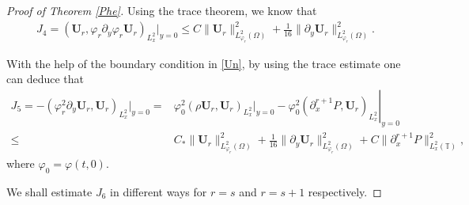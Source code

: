 \documentclass{amsart}
\numberwithin{equation}{section}
\begin{document}
\begin{proof}[Proof of Theorem \ref{Phe}]
Using the trace theorem, we know that
\begin{align*}
J_{4}
=(\mathbf{U}_{r},\varphi_{r}\partial_{y}\varphi_{r}\mathbf{U}_{r})_{L_{x}^{2}}|_{y=0}
\leq C\|\mathbf{U}_{r}\|_{L_{\varphi_{r}}^{2}(\Omega)}^{2}
     +\frac{1}{16}\|\partial_{y}\mathbf{U}_{r}\|_{L_{\varphi_{r}}^{2}(\Omega)}^{2}.
\end{align*}


With the help of the boundary condition in \eqref{Un}, by using the trace estimate one can deduce that
\begin{align*}
J_{5}
=-(\varphi_{r}^{2}\partial_{y}\mathbf{U}_{r},\mathbf{U}_{r})_{L_{x}^{2}}|_{y=0}
=& \varphi_{0}^{2}(\rho \mathbf{U}_{r},\mathbf{U}_{r})_{L_{x}^{2}}|_{y=0}
  -\left.\varphi_{0}^{2}(\partial_{x}^{r+1}P,\mathbf{U}_{r})_{L_{x}^{2}}\right|_{y=0}\\
\leq& C_{*}\|\mathbf{U}_{r}\|_{L_{\varphi_{r}}^{2}(\Omega)}^{2}
     +\frac{1}{16}\|\partial_{y}\mathbf{U}_{r}\|_{L_{\varphi_{r}}^{2}(\Omega)}^{2}
     +C\|\partial_{x}^{r+1}P\|_{L_{x}^{2}(\mathbb{T})}^{2},
\end{align*}
where $\varphi_{0}=\varphi(t,0)$.

We shall estimate $J_{6}$ in different ways for $r=s$ and $r=s+1$ respectively.


\end{proof}
\end{document}

